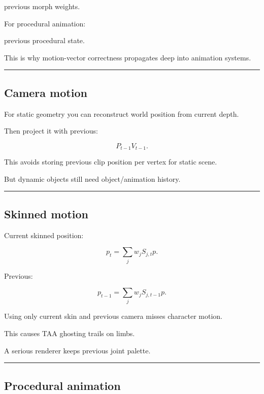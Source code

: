 previous morph weights.

For procedural animation:

previous procedural state.

This is why motion-vector correctness propagates deep into animation systems.

\begin{center}\rule{0.5\linewidth}{0.5pt}\end{center}

\subsection{Camera motion}\label{04-visual-computing-ii-ch040-camera-motion}

For static geometry you can reconstruct world position from current depth.

Then project it with previous:

\[
P_{t-1}V_{t-1}.
\]

This avoids storing previous clip position per vertex for static scene.

But dynamic objects still need object/animation history.

\begin{center}\rule{0.5\linewidth}{0.5pt}\end{center}

\subsection{Skinned motion}\label{04-visual-computing-ii-ch040-skinned-motion}

Current skinned position:

\[
p_t=
\sum_j
w_j
S_{j,t}p.
\]

Previous:

\[
p_{t-1}
=
\sum_j
w_j
S_{j,t-1}p.
\]

Using only current skin and previous camera misses character motion.

This causes TAA ghosting trails on limbs.

A serious renderer keeps previous joint palette.

\begin{center}\rule{0.5\linewidth}{0.5pt}\end{center}

\subsection{Procedural animation}\label{04-visual-computing-ii-ch040-procedural-animation}

